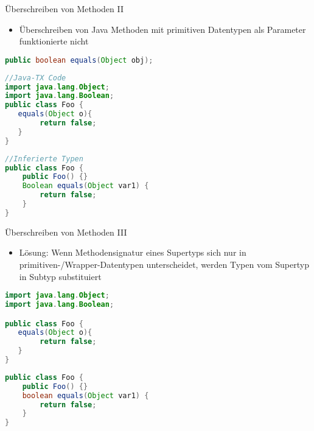 \documentclass{beamer}
\begin{document}
\begin{frame}[fragile]{Überschreiben von Methoden II}
    \begin{itemize}
        \item Überschreiben von Java Methoden mit primitiven Datentypen als Parameter funktionierte nicht
    \end{itemize}
\vspace*{-\baselineskip}

\begin{lstlisting}[language=java]
public boolean equals(Object obj);
\end{lstlisting}

   \begin{lstlisting}[language=java]
//Java-TX Code
import java.lang.Object;
import java.lang.Boolean;
public class Foo {
   equals(Object o){
        return false;
   } 
}
   \end{lstlisting} 
   \begin{lstlisting}[language=java]
//Inferierte Typen
public class Foo {
    public Foo() {}
    Boolean equals(Object var1) {
        return false;
    }
}
\end{lstlisting}
\end{frame}

\begin{frame}[fragile]{Überschreiben von Methoden III}
    \begin{itemize}
        \item Lösung: Wenn Methodensignatur eines Supertyps sich nur in primitiven-/Wrapper-Datentypen unterscheidet, werden Typen vom Supertyp in Subtyp substituiert
    \end{itemize}
   \begin{lstlisting}[language=java]
import java.lang.Object;
import java.lang.Boolean;

public class Foo {
   equals(Object o){
        return false;
   } 
}
   \end{lstlisting} 
   \begin{lstlisting}[language=java]
public class Foo {
    public Foo() {}
    boolean equals(Object var1) {
        return false;
    }
}
\end{lstlisting}
\end{frame}
\end{document}
